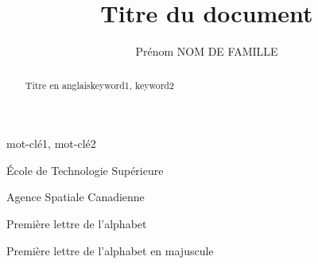 \documentclass[letterpaper%
, twoside%
, 12pt%
,these%
,french
,creativecommons,hyperref,withAlgo2e%
]{thETS}
\title{Titre du document}
\author{Prénom NOM DE FAMILLE}
\begin{document}

\maketitle

\presentjury

\begin{avantpropos}

\lipsum[1] %

\end{avantpropos}



\begin{remerciements}

\lipsum[1] %


\end{remerciements}



\begin{sommaire}{mot-clé1, mot-clé2}

\lipsum[1] %

\end{sommaire}


\begin{abstract}{Titre en anglais}{keyword1, keyword2}

\lipsum[1] %

\end{abstract}


\tableofcontents


\listoftables


\listoffigures


\begin{listofabbr}[3cm]
\item [ETS] École de Technologie Supérieure
\item [ASC] Agence Spatiale Canadienne
\end{listofabbr}


\begin{listofsymbols}[3cm]
\item [a] Première lettre de l'alphabet
\item [A] Première lettre de l'alphabet en majuscule
\end{listofsymbols}
\end{document}
